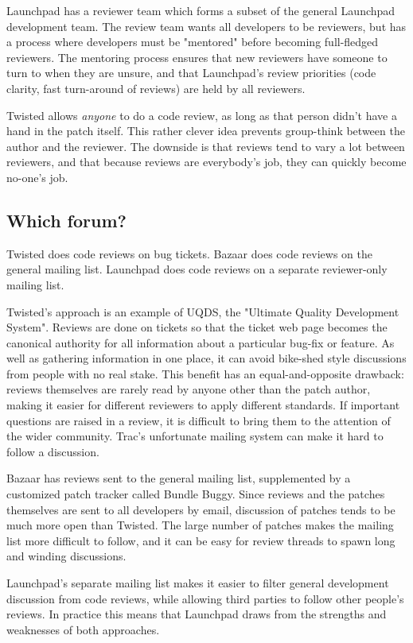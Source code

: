 \documentclass{article}
\begin{document}
Launchpad has a reviewer team which forms a subset of the general Launchpad development team. The review team wants all developers to be reviewers, but has a process where developers must be "mentored" before becoming full-fledged reviewers. The mentoring process ensures that new reviewers have someone to turn to when they are unsure, and that Launchpad's review priorities (code clarity, fast turn-around of reviews) are held by all reviewers.

Twisted allows {\it anyone} to do a code review, as long as that person didn't have a hand in the patch itself. This rather clever idea prevents group-think between the author and the reviewer. The downside is that reviews tend to vary a lot between reviewers, and that because reviews are everybody's job, they can quickly become no-one's job.

\subsection{Which forum?}

Twisted does code reviews on bug tickets. Bazaar does code reviews on the general mailing list. Launchpad does code reviews on a separate reviewer-only mailing list.

Twisted's approach is an example of UQDS, the "Ultimate Quality Development System". Reviews are done on tickets so that the ticket web page becomes the canonical authority for all information about a particular bug-fix or feature. As well as gathering information in one place, it can avoid bike-shed style discussions from people with no real stake. This benefit has an equal-and-opposite drawback: reviews themselves are rarely read by anyone other than the patch author, making it easier for different reviewers to apply different standards. If important questions are raised in a review, it is difficult to bring them to the attention of the wider community. Trac's unfortunate mailing system can make it hard to follow a discussion.

Bazaar has reviews sent to the general mailing list, supplemented by a customized patch tracker called Bundle Buggy. Since reviews and the patches themselves are sent to all developers by email, discussion of patches tends to be much more open than Twisted. The large number of patches makes the mailing list more difficult to follow, and it can be easy for review threads to spawn long and winding discussions.

Launchpad's separate mailing list makes it easier to filter general development discussion from code reviews, while allowing third parties to follow other people's reviews. In practice this means that Launchpad draws from the strengths and weaknesses of both approaches.
\end{document}
